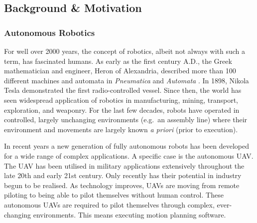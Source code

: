 
\subsection{Background \& Motivation}
    

    \subsubsection{Autonomous Robotics}
        For well over 2000 years, the concept of robotics, albeit not always with such a term, has fascinated humans. As early as the first century A.D., the Greek mathematician and engineer, Heron of Alexandria, described more than 100 different machines and \gls{automata} in \textit{Pneumatica} and \textit{Automata} \cite{Alexandrinus}. In 1898, Nikola Tesla demonstrated the first radio-controlled vessel. Since then, the world has seen widespread application of robotics in manufacturing, mining, transport, exploration, and weaponry. For the last few decades, robots have operated in controlled, largely unchanging environments (e.g.\ an assembly line) where their environment and movements are largely known \textit{\gls{a priori}} (prior to execution).

        In recent years a new generation of fully autonomous robots has been developed for a wide range of complex applications. A specific case is the autonomous \gls{UAV}. The \gls{UAV} has been utilised in military applications extensively throughout the late 20th and early 21st century. Only recently has their potential in industry begun to be realised. As technology improves, \glspl{UAV} are moving from remote piloting to being able to pilot themselves without human control. These autonomous \glspl{UAV} are required to pilot themselves through complex, ever-changing environments. This means executing motion planning software.

